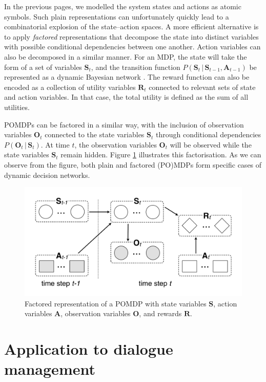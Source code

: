 In the previous pages, we modelled the system states and actions as atomic symbols.  Such plain representations can unfortunately quickly lead to a combinatorial explosion of the state--action spaces. A more efficient alternative is to apply \textit{factored} representations that decompose the state into distinct variables with possible conditional dependencies between one another.  Action variables can also be decomposed in a similar manner.  For an MDP, the state will take the form of a set of variables $\mathbf{S}_t$, and the transition function $P(\mathbf{S}_t \, | \, \mathbf{S}_{t-1},\mathbf{A}_{t-1})$ be represented as a dynamic Bayesian network \citep{boutilier1999}. The reward function can also be encoded as a collection of utility variables $\mathbf{R}_t$ connected to relevant sets of state and action variables. In that case, the total utility is defined as the sum of all utilities.

POMDPs can be factored in a similar way, with the inclusion of observation variables $\mathbf{O}_t$ connected to the state variables $\mathbf{S}_t$ through conditional dependencies $P(\mathbf{O}_t \, | \, \mathbf{S}_t)$.  At time $t$, the observation variables $\mathbf{O}_t$ will be observed while the state variables  $\mathbf{S}_t$ remain hidden. 
Figure \ref{fig:pomdp3} illustrates this factorisation. As we can observe from the figure, both plain and factored (PO)MDPs form specific cases of dynamic decision networks.

\begin{figure}[h]
\centering
\includegraphics[scale=0.25]{imgs/pomdp3.pdf}
\caption{Factored representation of a POMDP with state variables $\mathbf{S}$, action variables $\mathbf{A}$, observation variables $\mathbf{O}$, and rewards $\mathbf{R}$. }
\label{fig:pomdp3}
\end{figure}

\section{Application to dialogue management}
\label{sec:application-dm}


